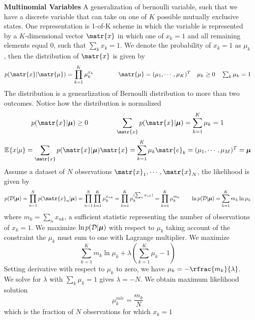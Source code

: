 \documentclass[11pt]{article}
\begin{document}
\begin{defn*}
    \textbf{Multinomial Variables} A generalization of bernoulli variable, such that we have a discrete variable that can take on one of $K$ possible mutually exclusive states. One representation is 1-of-K scheme in which the variable is represented by a $K$-dimensional vector $\matr{x}$ in which one of $x_k = 1$ and all remaining elements equal 0, such that $\textstyle\sum_k x_k = 1$. We denote the probability of $x_k=1$ as $\mu_k$, then the distribution of $\matr{x}$ is given by 
    \[
        p(\matr{x}|\matr{\mu}) = \prod_{k=1}^K \mu_k^{x_k}
        \quad \quad \quad \quad 
        \matr{\mu} = (\mu_1,\cdots,\mu_K)^T 
        \quad 
        \mu_k \geq 0 \quad \textstyle\sum_k \mu_k = 1
    \]
    The distribution is a genearlization of Bernoulli distribution to more than two outcomes. Notice how the distribution is normalized 
    \[
        p(\matr{x}|\bmu) \geq 0
        \quad \quad \quad \quad 
        \sum_{\matr{x}} p(\matr{x}|\bmu) = \sum_{k=1}^K \mu_k = 1
    \]
    \[
        \E{x|\mu} = \sum_{\matr{x}} p(\matr{x}|\bmu)\matr{x} = \sum_{k=1}^K \mu_k \matr{e}_k = (\mu_1, \cdots, \mu_M)^T = \bmu
    \]
    Assume a dataset of $N$ observations $\matr{x}_1,\cdots, \matr{x}_N$, the likelihood is given by 
    \[
        p(\mathcal{D}|\bmu) = \prod_{n=1}^N p(\matr{x}_n | \bmu)
        = \prod_{n=1}^N \prod_{k=1}^K \mu_k^{x_{nk}} 
        = \prod_{k=1}^K \mu_k^{(\sum_n x_{nk})} 
        = \prod_{k=1}^K \mu_k^{m_k}
        \quad\quad 
        \ln{p(\mathcal{D}|\bmu)} = \sum_{k=1}^K m_k \ln{\mu_k}
    \]
    where $m_k = \textstyle\sum_n x_{nk}$, a sufficient statistic representing the number of observations of $x_k =1$. We maximize $\ln{p(\mathcal{D}|\boldsymbol{\mu})}$ with respect to $\mu_k$ taking account of the constraint the $\mu_k$ must sum to one with Lagrange multiplier. We maximize 
    \[
        \sum_{k=1}^K m_k \ln{\mu_k} + \lambda \left( \sum_{k=1}^K \mu_k - 1 \right)
    \]
    Setting derivative with respect to $\mu_k$ to zero, we have $\mu_k = - \rfrac{m_k}{\lambda}$. We solve for $\lambda$ with $\textstyle \sum_k \mu_k = 1$ gives $\lambda = -N$. We obtain maximum likelihood solution 
    \[
        \mu_k^{mle} = \frac{m_k}{N}    
    \]
    which is the fraction of $N$ observations for which $x_k =1$
\end{defn*}
\end{document}
